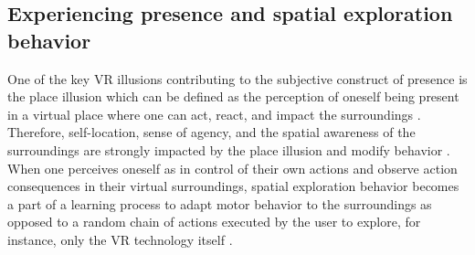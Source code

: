 \subsection{Experiencing presence and spatial exploration behavior}

One of the key VR illusions contributing to the subjective construct of presence is the place illusion which can be defined as the perception of oneself being present in a virtual place where one can act, react, and impact the surroundings \cite{Slater2009}. Therefore, self-location, sense of agency, and the spatial awareness of the surroundings are strongly impacted by the place illusion and modify behavior \cite{Kilteni2012}. When one perceives oneself as in control of their own actions and observe action consequences in their virtual surroundings, spatial exploration behavior becomes a part of a learning process to adapt motor behavior to the surroundings as opposed to a random chain of actions executed by the user to explore, for instance, only the VR technology itself \cite{Tan2011}.